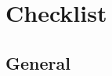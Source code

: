 \documentclass{report}
\begin{document}
\section*{Checklist}


		\subsection*{General}


\newcommand{\makerow}[1]{%
 #1 &
 \stepcounter{row}%
 \mbox{\CheckBox[print,name=YES\therow, width=0.7em, height=0.7em]{}} &
 \mbox{\CheckBox[print,name=NO\therow, width=0.7em, height=0.7em]{}} &
 \mbox{\CheckBox[print,name=N/A\therow, width=0.7em, height=0.7em]{}} \\
}
\end{document}
